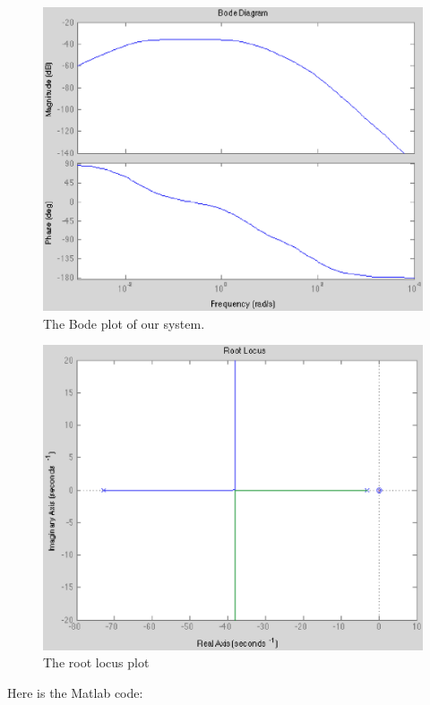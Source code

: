 \documentclass{notes}
\begin{document}
\begin{figure}[!h]
 \begin{center}
   \includegraphics[width=4.5 in]{pics/performance_measurements/bode_plot.eps}
 \end{center}
 \caption{The Bode plot of our system.}
 \label{fig:bode_plot}
\end{figure}

\begin{figure}[!h]
  \begin{center}
    \includegraphics[width=4.5 in]{pics/performance_measurements/root_locus.eps}
  \end{center}
  \caption{The root locus plot}
  \label{fig:root_locus}
\end{figure}

Here is the Matlab code:
\end{document}
